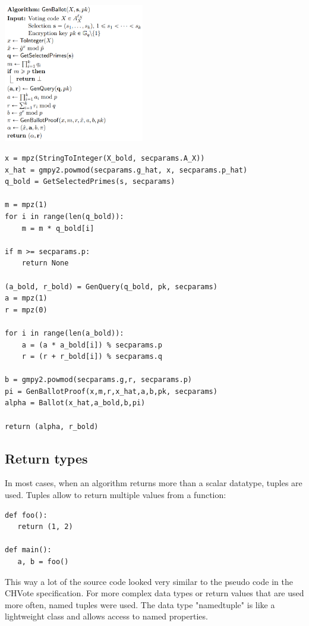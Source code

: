\documentclass[a4paper,12pt]{report}
\begin{document}
\begin{multicols}{2}
\includegraphics[width=0.46\textwidth]{images/genballot.png}
\columnbreak
\begin{verbatim}
x = mpz(StringToInteger(X_bold, secparams.A_X))
x_hat = gmpy2.powmod(secparams.g_hat, x, secparams.p_hat)
q_bold = GetSelectedPrimes(s, secparams)

m = mpz(1)
for i in range(len(q_bold)):
    m = m * q_bold[i]

if m >= secparams.p:
    return None

(a_bold, r_bold) = GenQuery(q_bold, pk, secparams)
a = mpz(1)
r = mpz(0)

for i in range(len(a_bold)):
    a = (a * a_bold[i]) % secparams.p
    r = (r + r_bold[i]) % secparams.q

b = gmpy2.powmod(secparams.g,r, secparams.p)
pi = GenBallotProof(x,m,r,x_hat,a,b,pk, secparams)
alpha = Ballot(x_hat,a_bold,b,pi)

return (alpha, r_bold)
\end{verbatim}
\end{multicols}

\subsection{Return types}
In most cases, when an algorithm returns more than a scalar datatype, tuples are used. Tuples allow to return multiple values from a function:

\begin{verbatim}
def foo():
   return (1, 2)

def main():
   a, b = foo()
\end{verbatim}

This way a lot of the source code looked very similar to the pseudo code in the CHVote specification. For more complex data types or return values that are used more often, named tuples were used. The data type "namedtuple" is like a lightweight class and allows access to named properties.
\end{document}
